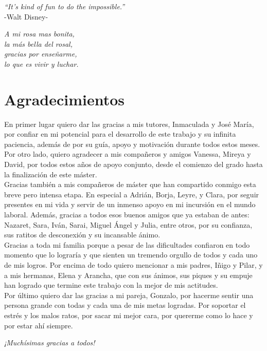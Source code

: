 {
	\vspace*{1cm}
	\begin{flushright}
		\textit{``It's kind of fun to do the impossible.''}\\
		\vspace{10pt}
		-Walt Disney-
	\end{flushright}
	
	\vspace*{14cm}
	\begin{flushright}
		\textit{A mi rosa mas bonita,\\
		la más bella del rosal,\\
		gracias por enseñarme,\\
		lo que es vivir y luchar.}
	\end{flushright}
}

\chapter*{Agradecimientos}

En primer lugar quiero dar las gracias a mis tutores, Inmaculada y José María, por confiar en mi potencial para el desarrollo de este trabajo y su infinita paciencia, además de por su guía, apoyo y motivación durante todos estos meses.\\
 
Por otro lado, quiero agradecer a mis compañeros y amigos Vanessa, Mireya y David, por todos estos años de apoyo conjunto, desde el comienzo del grado hasta la finalización de este máster.\\

Gracias también a mis compañeros de máster que han compartido conmigo esta breve pero intensa etapa. En especial a Adrián, Borja, Leyre, y Clara, por seguir presentes en mi vida y servir de un inmenso apoyo en mi incursión en el mundo laboral. Además, gracias a todos esos buenos amigos que ya estaban de antes: Nazaret, Sara, Iván, Sarai, Miguel Ángel y Julia, entre otros, por su confianza, sus ratitos de desconexión y su incansable ánimo.\\

Gracias a toda mi familia porque a pesar de las dificultades confiaron en todo momento que lo lograría y que sienten un tremendo orgullo de todos y cada uno de mis logros. Por encima de todo quiero mencionar a mis padres, Iñigo y Pilar, y a mis hermanas, Elena y Arancha, que con sus ánimos, sus piques y su empuje han logrado que termine este trabajo con la mejor de mis actitudes.\\

Por último quiero dar las gracias a mi pareja, Gonzalo, por hacerme sentir una persona grande con todas y cada una de mis metas logradas. Por soportar el estrés y los malos ratos, por sacar mi mejor cara, por quererme como lo hace y por estar ahí siempre.

\begin{flushright}
	\emph{¡Muchísimas gracias a todos!}
\end{flushright}